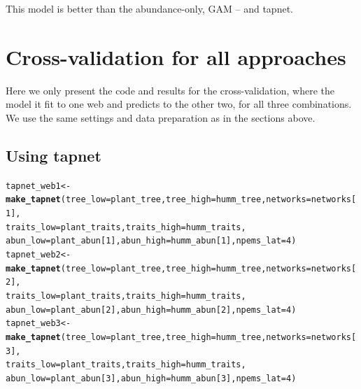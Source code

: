 \documentclass[a4paper, 11pt]{article}\usepackage[]{graphicx}\usepackage[]{color}
\makeatletter
\newcommand{\hlnum}[1]{\textcolor[rgb]{0.686,0.059,0.569}{#1}}%
\newcommand{\hlstd}[1]{\textcolor[rgb]{0.345,0.345,0.345}{#1}}%
\newcommand{\hlkwb}[1]{\textcolor[rgb]{0.69,0.353,0.396}{#1}}%
\newcommand{\hlkwc}[1]{\textcolor[rgb]{0.333,0.667,0.333}{#1}}%
\newcommand{\hlkwd}[1]{\textcolor[rgb]{0.737,0.353,0.396}{\textbf{#1}}}%
\newenvironment{kframe}{%
 \def\at@end@of@kframe{}%
 \ifinner\ifhmode%
  \def\at@end@of@kframe{\end{minipage}}%
  \begin{minipage}{\columnwidth}%
 \fi\fi%
 \def\FrameCommand##1{\hskip\@totalleftmargin \hskip-\fboxsep
 \colorbox{shadecolor}{##1}\hskip-\fboxsep
     \hskip-\linewidth \hskip-\@totalleftmargin \hskip\columnwidth}%
 \MakeFramed {\advance\hsize-\width
   \@totalleftmargin\z@ \linewidth\hsize
   \@setminipage}}%
 {\par\unskip\endMakeFramed%
 \at@end@of@kframe}
\newenvironment{knitrout}{}{} %
\makeatother
\begin{document}
This model is better than the abundance-only, GAM -- and tapnet.



\section{Cross-validation for all approaches}
Here we only present the code and results for the cross-validation, where the model it fit to one web and predicts to the other two, for all three combinations. We use the same settings and data preparation as in the sections above.

\subsection{Using tapnet}
\begin{knitrout}\small
{}\color{fgcolor}\begin{kframe}
\begin{alltt}
\hlstd{tapnet_web1} \hlkwb{<-} \hlkwd{make_tapnet}\hlstd{(}\hlkwc{tree_low}\hlstd{=plant_tree,} \hlkwc{tree_high}\hlstd{=humm_tree,} \hlkwc{networks}\hlstd{=networks[}\hlnum{1}\hlstd{],}
                           \hlkwc{traits_low}\hlstd{=plant_traits,} \hlkwc{traits_high}\hlstd{=humm_traits,}
                           \hlkwc{abun_low}\hlstd{=plant_abun[}\hlnum{1}\hlstd{],} \hlkwc{abun_high}\hlstd{=humm_abun[}\hlnum{1}\hlstd{],} \hlkwc{npems_lat}\hlstd{=}\hlnum{4}\hlstd{)}
\hlstd{tapnet_web2} \hlkwb{<-} \hlkwd{make_tapnet}\hlstd{(}\hlkwc{tree_low}\hlstd{=plant_tree,} \hlkwc{tree_high}\hlstd{=humm_tree,} \hlkwc{networks}\hlstd{=networks[}\hlnum{2}\hlstd{],}
                           \hlkwc{traits_low}\hlstd{=plant_traits,} \hlkwc{traits_high}\hlstd{=humm_traits,}
                           \hlkwc{abun_low}\hlstd{=plant_abun[}\hlnum{2}\hlstd{],} \hlkwc{abun_high}\hlstd{=humm_abun[}\hlnum{2}\hlstd{],} \hlkwc{npems_lat}\hlstd{=}\hlnum{4}\hlstd{)}
\hlstd{tapnet_web3} \hlkwb{<-} \hlkwd{make_tapnet}\hlstd{(}\hlkwc{tree_low}\hlstd{=plant_tree,} \hlkwc{tree_high}\hlstd{=humm_tree,} \hlkwc{networks}\hlstd{=networks[}\hlnum{3}\hlstd{],}
                           \hlkwc{traits_low}\hlstd{=plant_traits,} \hlkwc{traits_high}\hlstd{=humm_traits,}
                           \hlkwc{abun_low}\hlstd{=plant_abun[}\hlnum{3}\hlstd{],} \hlkwc{abun_high}\hlstd{=humm_abun[}\hlnum{3}\hlstd{],} \hlkwc{npems_lat}\hlstd{=}\hlnum{4}\hlstd{)}
\end{alltt}
\end{kframe}
\end{knitrout}
\end{document}
